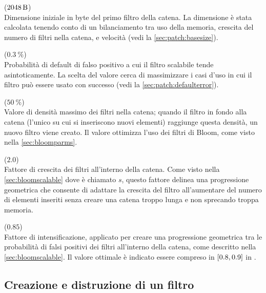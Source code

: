 \begin{description}[font={\bfseries\ttfamily}]

  \item[CONFIG\_BLOOM\_BASESIZE] ($\SI{2048}{\byte}$) \\ Dimensione iniziale in byte del primo
  filtro della catena. La dimensione è stata calcolata tenendo conto di un bilanciamento tra uso
  della memoria, crescita del numero di filtri nella catena, e velocità (vedi la
  \autoref{sec:patch:basesize}).

  \item[CONFIG\_BLOOM\_DEFAULTERROR] ($\SI{0.3}{\percent}$) \\ Probabilità di default di falso
  positivo a cui il filtro scalabile tende asintoticamente. La scelta del valore cerca di
  massimizzare i casi d'uso in cui il filtro può essere usato con successo (vedi la
  \autoref{sec:patch:defaulterror}).

  \item[CONFIG\_BLOOM\_DESIREDFILLRATIO] ($\SI{50}{\percent}$) \\ Valore di densità massimo dei
  filtri nella catena; quando il filtro in fondo alla catena (l'unico su cui si inseriscono nuovi
  elementi) raggiunge questa densità, un nuovo filtro viene creato. Il valore ottimizza l'uso dei
  filtri di Bloom, come visto nella \autoref{sec:bloomparms}.

  \item[CONFIG\_BLOOM\_ITEMGROWTHRATIO] ($\num{2.0}$) \\ Fattore di crescita dei filtri
  all'interno della catena. Come visto nella \autoref{sec:bloomscalable} dove è chiamato
  $s$, questo fattore delinea una progressione geometrica che consente di adattare la crescita del
  filtro all'aumentare del numero di elementi inseriti senza creare una catena troppo lunga
  e non sprecando troppa memoria.

  \item[CONFIG\_BLOOM\_TIGHTENINGRATIO] ($\num{0.85}$) \\ Fattore di intensificazione, applicato
  per creare una progressione geometrica tra le probabilità di falsi positivi dei filtri all'interno
  della catena, come descritto nella \autoref{sec:bloomscalable}. Il valore ottimale è indicato
  essere compreso in $\interval{0.8}{0.9}$ in \cite{bloom-scalable}.

\end{description}

\subsection{Creazione e distruzione di un filtro}

